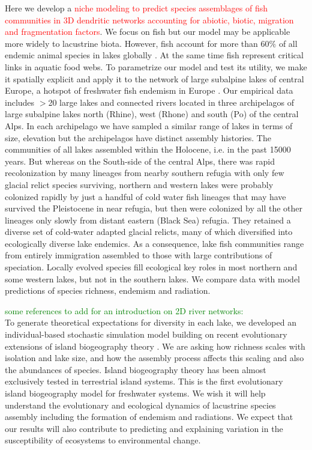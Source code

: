 \documentclass[12pt]{article}
\newcommand{\carlos}[1]{\textcolor{Red}{#1}}
\newcommand{\greg}[1]{\textcolor{Green}{#1}}
\begin{document}
Here we develop a \carlos{niche modeling to predict species assemblages of fish communities in 3D dendritic networks accounting for abiotic, biotic, migration and fragmentation factors}. We focus on
fish but our model may be applicable more widely to lacustrine
biota. However, fish account for more than 60$\%$ of all endemic
animal species in lakes globally \citep{Vadeboncoeur_Borders_2011}. At the
same time fish represent critical links in aquatic food webs. To
parametrize our model and test its utility, we make it spatially
explicit and apply it to the network of large subalpine lakes of
central Europe, a hotspot of freshwater fish endemism in Europe
\citep{Kottelat_handbook_2007}. Our
empirical data includes $>$20 large lakes and connected rivers located
in three archipelagos of large subalpine lakes north (Rhine), west
(Rhone) and south (Po) of the central Alps. In each archipelago we
have sampled a similar range of lakes in terms of size, elevation but
the archipelagos have distinct assembly histories. The communities of
all lakes assembled within the Holocene, i.e. in the past 15000
years. But whereas on the South-side of the central Alps, there was
rapid recolonization by many lineages from nearby southern refugia
with only few glacial relict species surviving, northern and western
lakes were probably colonized rapidly by just a handful of cold water
fish lineages that may have survived the Pleistocene in near refugia,
but then were colonized by all the other lineages only slowly from
distant eastern (Black Sea) refugia. They retained a diverse set of
cold-water adapted glacial relicts, many of which diversified into
ecologically diverse lake endemics. As a consequence, lake fish
communities range from entirely immigration assembled to those with
large contributions of speciation. Locally evolved species fill
ecological key roles in most northern and some western lakes, but not
in the southern lakes. We compare data with model predictions of
species richness, endemism and radiation.

\greg{some references to add for an introduction on 2D river networks: \citep{Honnay_plant_2001, Campbell_Grant_living_2007, Labonne_Linking_2008, Mehner_spatial_2014}}\\ To generate theoretical expectations for diversity in each
lake, we developed an individual-based stochastic simulation model
building on recent evolutionary extensions of island biogeography
theory \citep[][hereafter $R\&P$]{Rosindell_unified_2011}. We are asking
how richness scales with isolation and lake size, and how the assembly
process affects this scaling and also the abundances of species. Island biogeography theory has been almost exclusively tested in terrestrial island systems. This is the first evolutionary island biogeography model for freshwater systems. We wish it will help understand the evolutionary and
ecological dynamics of lacustrine species assembly including the
formation of endemism and radiations. We expect that our results will
also contribute to predicting and explaining variation in the
susceptibility of ecosystems to environmental change.
\end{document}
